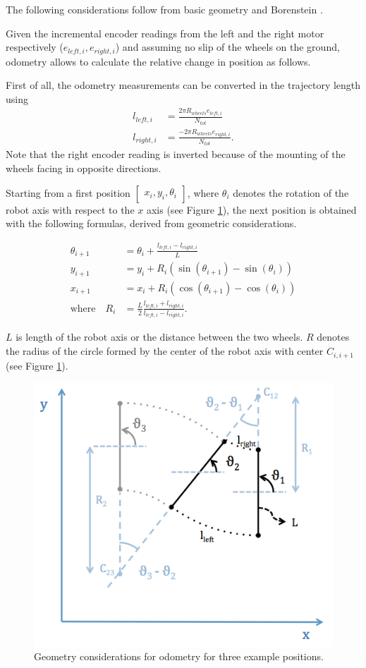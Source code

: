 The following considerations follow from basic geometry and Borenstein \cite{Borenstein1996}.

Given the incremental encoder readings from the left and the right motor respectively ($e_{left,i},e_{right,i}$) and assuming no slip of the wheels on the ground, odometry allows to calculate the relative change in position as follows.

First of all, the odometry measurements can be converted in the trajectory length using
\begin{align}
    l_{left,i} &= \frac{2\pi R_{wheels} e_{left,i}}{N_{tot}} \\
    l_{right,i} &= \frac{-2\pi R_{wheels} e_{right,i}}{N_{tot}}.
    \label{eq:encoders} 
\end{align}
Note that the right encoder reading is inverted because of the mounting of the wheels facing in opposite directions.

Starting from a first position $\begin{bmatrix} x_i,y_i,\theta_i \end{bmatrix}$, where $\theta_i$ denotes the rotation of the robot axis with respect to the $x$ axis (see Figure \ref{fig:odometry}), the next position is obtained with the following formulas, derived from geometric considerations.

\begin{subequations}
    \begin{align}
        \theta_{i+1} &= \theta_i + \frac{l_{left,i}-l_{right,i}}{L} \\
        y_{i+1} &= y_i + R_i (\sin(\theta_{i+1})-\sin(\theta_{i})) \\
        x_{i+1} &= x_i + R_i (\cos(\theta_{i+1})-\cos(\theta_i)) \\
        \text{where} \quad R_{i} &= \frac{L}{2} \frac{l_{left,i}+l_{right,i}}{l_{left,i}-l_{right,i}}.
    \label{eq:positions}
\end{align}
\end{subequations}

$L$ is length of the robot axis or the distance between the two wheels. 
$R$ denotes the radius of the circle formed by the center of the robot axis with center $C_{i,i+1}$ (see Figure \ref{fig:odometry}).
\hspace{2em}

\begin{figure}[htb]
    \centering
    \includegraphics[width=0.7\linewidth]{files/Odometry.png}
    \caption{Geometry considerations for odometry for three example positions.}
    \label{fig:odometry}
\end{figure}
